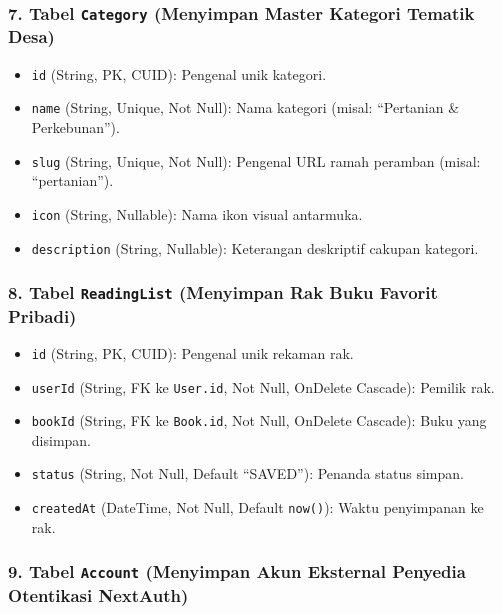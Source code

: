 \documentclass[
  indonesian,
  12pt,
]{report}
\providecommand{\tightlist}{%
  \setlength{\itemsep}{0pt}\setlength{\parskip}{0pt}}
\begin{document}
\subsubsection{\texorpdfstring{7. Tabel \texttt{Category} (Menyimpan
Master Kategori Tematik
Desa)}{7. Tabel Category (Menyimpan Master Kategori Tematik Desa)}}\label{tabel-category-menyimpan-master-kategori-tematik-desa}

\begin{itemize}
\tightlist
\item
  \texttt{id} (String, PK, CUID): Pengenal unik kategori.
\item
  \texttt{name} (String, Unique, Not Null): Nama kategori (misal:
  ``Pertanian \& Perkebunan'').
\item
  \texttt{slug} (String, Unique, Not Null): Pengenal URL ramah peramban
  (misal: ``pertanian'').
\item
  \texttt{icon} (String, Nullable): Nama ikon visual antarmuka.
\item
  \texttt{description} (String, Nullable): Keterangan deskriptif cakupan
  kategori.
\end{itemize}

\subsubsection{\texorpdfstring{8. Tabel \texttt{ReadingList} (Menyimpan
Rak Buku Favorit
Pribadi)}{8. Tabel ReadingList (Menyimpan Rak Buku Favorit Pribadi)}}\label{tabel-readinglist-menyimpan-rak-buku-favorit-pribadi}

\begin{itemize}
\tightlist
\item
  \texttt{id} (String, PK, CUID): Pengenal unik rekaman rak.
\item
  \texttt{userId} (String, FK ke \texttt{User.id}, Not Null, OnDelete
  Cascade): Pemilik rak.
\item
  \texttt{bookId} (String, FK ke \texttt{Book.id}, Not Null, OnDelete
  Cascade): Buku yang disimpan.
\item
  \texttt{status} (String, Not Null, Default ``SAVED''): Penanda status
  simpan.
\item
  \texttt{createdAt} (DateTime, Not Null, Default \texttt{now()}): Waktu
  penyimpanan ke rak.
\end{itemize}

\subsubsection{\texorpdfstring{9. Tabel \texttt{Account} (Menyimpan Akun
Eksternal Penyedia Otentikasi
NextAuth)}{9. Tabel Account (Menyimpan Akun Eksternal Penyedia Otentikasi NextAuth)}}\label{tabel-account-menyimpan-akun-eksternal-penyedia-otentikasi-nextauth}
\end{document}
